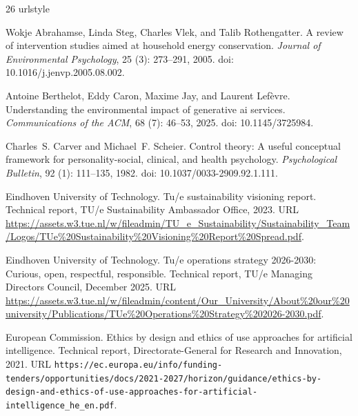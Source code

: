 \documentclass[11pt,a4paper]{article}
\begin{document}
\clearpage
\nocite{*}
\begin{thebibliography}{26}
\providecommand{\natexlab}[1]{#1}
\providecommand{\url}[1]{\texttt{#1}}
\expandafter\ifx\csname urlstyle\endcsname\relax
  \providecommand{\doi}[1]{doi: #1}\else
  \providecommand{\doi}{doi: \begingroup \urlstyle{rm}\Url}\fi

Wokje Abrahamse, Linda Steg, Charles Vlek, and Talib Rothengatter.
\newblock A review of intervention studies aimed at household energy
  conservation.
\newblock \emph{Journal of Environmental Psychology}, 25 (3):
  273--291, 2005.
\newblock \doi{10.1016/j.jenvp.2005.08.002}.

Antoine Berthelot, Eddy Caron, Maxime Jay, and Laurent Lef\`evre.
\newblock Understanding the environmental impact of generative ai services.
\newblock \emph{Communications of the ACM}, 68 (7): 46--53,
  2025.
\newblock \doi{10.1145/3725984}.

Charles~S. Carver and Michael~F. Scheier.
\newblock Control theory: A useful conceptual framework for personality-social,
  clinical, and health psychology.
\newblock \emph{Psychological Bulletin}, 92 (1): 111--135,
  1982.
\newblock \doi{10.1037/0033-2909.92.1.111}.

{Eindhoven University of Technology}.
\newblock Tu/e sustainability visioning report.
\newblock Technical report, TU/e Sustainability Ambassador Office, 2023.
\newblock URL
  \url{https://assets.w3.tue.nl/w/fileadmin/TU_e_Sustainability/Sustainability_Team/Logos/TUe%20Sustainability%20Visioning%20Report%20Spread.pdf}.

{Eindhoven University of Technology}.
\newblock Tu/e operations strategy 2026-2030: Curious, open, respectful,
  responsible.
\newblock Technical report, TU/e Managing Directors Council, December 2025.
\newblock URL
  \url{https://assets.w3.tue.nl/w/fileadmin/content/Our_University/About%20our%20university/Publications/TUe%20Operations%20Strategy%202026-2030.pdf}.

{European Commission}.
\newblock Ethics by design and ethics of use approaches for artificial
  intelligence.
\newblock Technical report, Directorate-General for Research and Innovation,
  2021.
\newblock URL
  \url{https://ec.europa.eu/info/funding-tenders/opportunities/docs/2021-2027/horizon/guidance/ethics-by-design-and-ethics-of-use-approaches-for-artificial-intelligence_he_en.pdf}.


\end{thebibliography}
\end{document}
